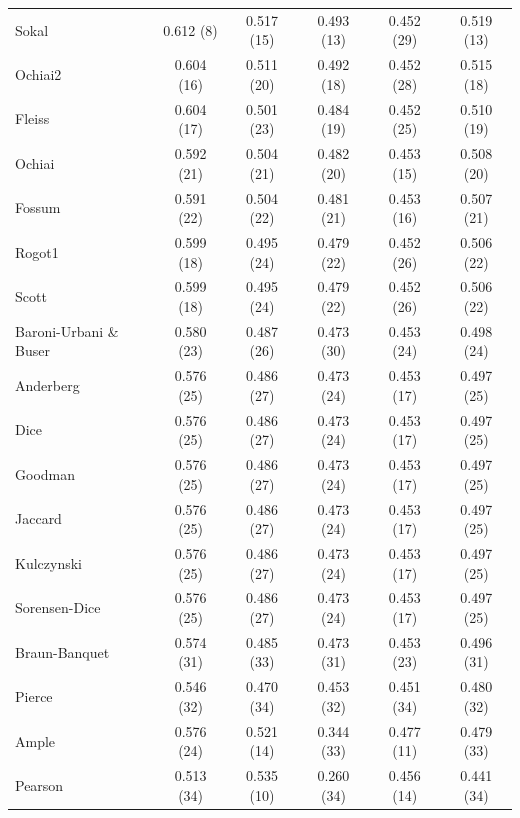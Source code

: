 \begin{table}[t]
{\begin{tabular}{lccccc}
Sokal & 0.612 (8) & 0.517 (15) & 0.493 (13) & 0.452 (29) & 0.519 (13) \\
Ochiai2 & 0.604 (16) & 0.511 (20) & 0.492 (18) & 0.452 (28) & 0.515 (18) \\
Fleiss & 0.604 (17) & 0.501 (23) & 0.484 (19) & 0.452 (25) & 0.510 (19) \\
Ochiai & 0.592 (21) & 0.504 (21) & 0.482 (20) & 0.453 (15) & 0.508 (20) \\
Fossum & 0.591 (22) & 0.504 (22) & 0.481 (21) & 0.453 (16) & 0.507 (21) \\
Rogot1 & 0.599 (18) & 0.495 (24) & 0.479 (22) & 0.452 (26) & 0.506 (22) \\
Scott & 0.599 (18) & 0.495 (24) & 0.479 (22) & 0.452 (26) & 0.506 (22) \\
Baroni-Urbani \& Buser & 0.580 (23) & 0.487 (26) & 0.473 (30) & 0.453 (24) & 0.498 (24) \\
Anderberg & 0.576 (25) & 0.486 (27) & 0.473 (24) & 0.453 (17) & 0.497 (25) \\
Dice & 0.576 (25) & 0.486 (27) & 0.473 (24) & 0.453 (17) & 0.497 (25) \\
Goodman & 0.576 (25) & 0.486 (27) & 0.473 (24) & 0.453 (17) & 0.497 (25) \\
Jaccard & 0.576 (25) & 0.486 (27) & 0.473 (24) & 0.453 (17) & 0.497 (25) \\
Kulczynski & 0.576 (25) & 0.486 (27) & 0.473 (24) & 0.453 (17) & 0.497 (25) \\
Sorensen-Dice & 0.576 (25) & 0.486 (27) & 0.473 (24) & 0.453 (17) & 0.497 (25) \\
Braun-Banquet & 0.574 (31) & 0.485 (33) & 0.473 (31) & 0.453 (23) & 0.496 (31) \\
Pierce & 0.546 (32) & 0.470 (34) & 0.453 (32) & 0.451 (34) & 0.480 (32) \\
Ample & 0.576 (24) & 0.521 (14) & 0.344 (33) & 0.477 (11) & 0.479 (33) \\
Pearson & 0.513 (34) & 0.535 (10) & 0.260 (34) & 0.456 (14) & 0.441 (34) \\
\bottomrule
\end{tabular}
}
\end{table}
